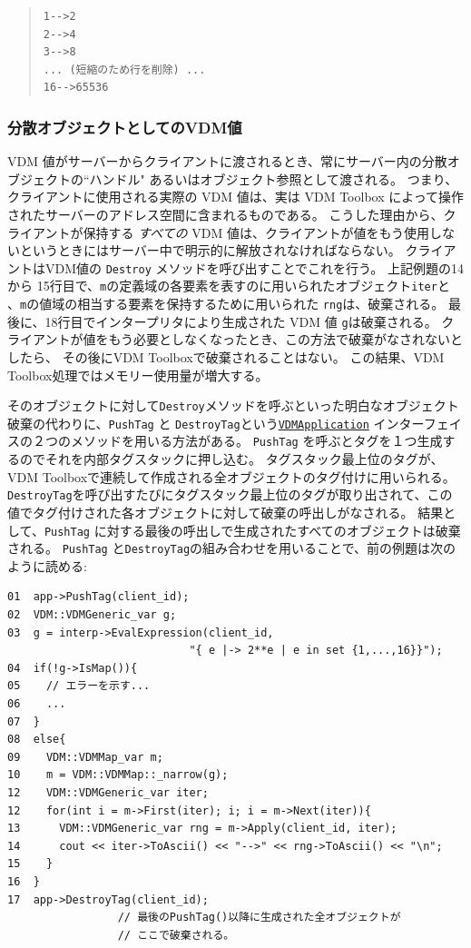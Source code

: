 \documentclass[\pformat,12pt]{jarticle}
\newcommand{\VDMApplication}{\hyperlink{interface.VDMApplication}{VDMApplication}}
\begin{document}
\begin{quote}
\begin{verbatim}    
1-->2 
2-->4 
3-->8 
... (短縮のため行を削除) ...  
16-->65536
\end{verbatim}
\end{quote}

\subsubsection{分散オブジェクトとしてのVDM値}

VDM 値がサーバーからクライアントに渡されるとき、常にサーバー内の分散オブジェクトの``ハンドル" あるいはオブジェクト参照として渡される。
つまり、クライアントに使用される実際の VDM 値は、実は VDM Toolbox によって操作されたサーバーのアドレス空間に含まれるものである。
こうした理由から、クライアントが保持する {\em すべての} VDM 値は、クライアントが値をもう使用しないというときにはサーバー中で明示的に解放されなければならない。
クライアントはVDM値の {\tt Destroy} メソッドを呼び出すことでこれを行う。
 上記例題の14から 15行目で、{\tt m}の定義域の各要素を表すのに用いられたオブジェクト{\tt iter}と 、{\tt m}の値域の相当する要素を保持するために用いられた {\tt rng}は、破棄される。
最後に、18行目でインタープリタにより生成された VDM 値 {\tt g}は破棄される。
クライアントが値をもう必要としなくなったとき、この方法で破棄がなされないとしたら、 その後にVDM Toolboxで破棄されることはない。 
この結果、VDM Toolbox処理ではメモリー使用量が増大する。

そのオブジェクトに対して{\tt Destroy}メソッドを呼ぶといった明白なオブジェクト破棄の代わりに、{\tt PushTag} と {\tt  DestroyTag}という{\tt \VDMApplication} インターフェイスの２つのメソッドを用いる方法がある。
 {\tt PushTag} を呼ぶとタグを１つ生成するのでそれを内部タグスタックに押し込む。
タグスタック最上位のタグが、VDM Toolboxで連続して作成される全オブジェクトのタグ付けに用いられる。
 {\tt DestroyTag}を呼び出すたびにタグスタック最上位のタグが取り出されて、この値でタグ付けされた各オブジェクトに対して破棄の呼出しがなされる。
結果として、{\tt PushTag} に対する最後の呼出しで生成されたすべてのオブジェクトは破棄される。
 {\tt PushTag} と{\tt DestroyTag}の組み合わせを用いることで、前の例題は次のように読める:

\begin{verbatim}
01  app->PushTag(client_id);
02  VDM::VDMGeneric_var g;
03  g = interp->EvalExpression(client_id, 
                            "{ e |-> 2**e | e in set {1,...,16}}");
04  if(!g->IsMap()){
05    // エラーを示す...
06    ...
07  }
08  else{
09    VDM::VDMMap_var m;
10    m = VDM::VDMMap::_narrow(g);
12    VDM::VDMGeneric_var iter;
12    for(int i = m->First(iter); i; i = m->Next(iter)){
13      VDM::VDMGeneric_var rng = m->Apply(client_id, iter);
14      cout << iter->ToAscii() << "-->" << rng->ToAscii() << "\n"; 
15    }
16  }
17  app->DestroyTag(client_id); 
                 // 最後のPushTag()以降に生成された全オブジェクトが
                 // ここで破棄される。
\end{verbatim}
\end{document}
